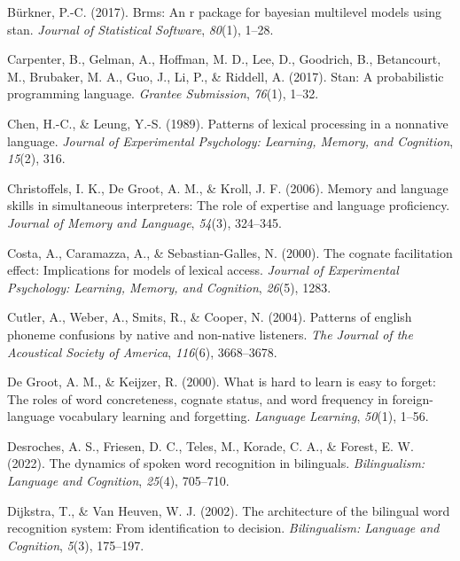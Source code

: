 \documentclass[
]{article}
\newlength{\cslhangindent}
\newenvironment{CSLReferences}[2] %
 {\begin{list}{}{%
  \setlength{\itemindent}{0pt}
  \setlength{\leftmargin}{0pt}
  \setlength{\parsep}{0pt}
  \ifodd #1
   \setlength{\leftmargin}{\cslhangindent}
   \setlength{\itemindent}{-1\cslhangindent}
  \fi
  \setlength{\itemsep}{#2\baselineskip}}}
 {\end{list}}
\begin{document}
\begin{CSLReferences}{1}{0}
Bürkner, P.-C. (2017). Brms: An r package for bayesian multilevel models
using stan. \emph{Journal of Statistical Software}, \emph{80}(1), 1--28.

Carpenter, B., Gelman, A., Hoffman, M. D., Lee, D., Goodrich, B.,
Betancourt, M., Brubaker, M. A., Guo, J., Li, P., \& Riddell, A. (2017).
Stan: A probabilistic programming language. \emph{Grantee Submission},
\emph{76}(1), 1--32.

Chen, H.-C., \& Leung, Y.-S. (1989). Patterns of lexical processing in a
nonnative language. \emph{Journal of Experimental Psychology: Learning,
Memory, and Cognition}, \emph{15}(2), 316.

Christoffels, I. K., De Groot, A. M., \& Kroll, J. F. (2006). Memory and
language skills in simultaneous interpreters: The role of expertise and
language proficiency. \emph{Journal of Memory and Language},
\emph{54}(3), 324--345.

Costa, A., Caramazza, A., \& Sebastian-Galles, N. (2000). The cognate
facilitation effect: Implications for models of lexical access.
\emph{Journal of Experimental Psychology: Learning, Memory, and
Cognition}, \emph{26}(5), 1283.

Cutler, A., Weber, A., Smits, R., \& Cooper, N. (2004). Patterns of
english phoneme confusions by native and non-native listeners. \emph{The
Journal of the Acoustical Society of America}, \emph{116}(6),
3668--3678.

De Groot, A. M., \& Keijzer, R. (2000). What is hard to learn is easy to
forget: The roles of word concreteness, cognate status, and word
frequency in foreign-language vocabulary learning and forgetting.
\emph{Language Learning}, \emph{50}(1), 1--56.

Desroches, A. S., Friesen, D. C., Teles, M., Korade, C. A., \& Forest,
E. W. (2022). The dynamics of spoken word recognition in bilinguals.
\emph{Bilingualism: Language and Cognition}, \emph{25}(4), 705--710.

Dijkstra, T., \& Van Heuven, W. J. (2002). The architecture of the
bilingual word recognition system: From identification to decision.
\emph{Bilingualism: Language and Cognition}, \emph{5}(3), 175--197.


\end{CSLReferences}
\end{document}

